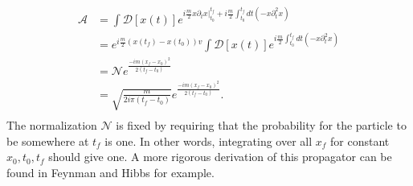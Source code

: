 \begin{equation}
\begin{split}
\mathcal{A} &= \int \mathcal{D}[x(t)] e^{i\frac{m}{2}x\partial_t x|^{t_f}_{t_0} + i\frac{m}{2}\int_{t_0}^{t_f} dt (-x \partial^2_t x)} \\ 
            &= e^{i\frac{m}{2}(x(t_f) - x(t_0))v}\int \mathcal{D}[x(t)] e^{i\frac{m}{2}\int_{t_0}^{t_f} dt (-x \partial^2_t x)} \\
            &= \mathcal{N}e^{\frac{-im(x_f - x_0)^2}{2(t_f - t_0)}} \\
            &= \sqrt{\frac{m}{2i\pi(t_f-t_0)}}e^{\frac{-im(x_f - x_0)^2}{2(t_f - t_0)}}. \\
\end{split}
\end{equation}
The normalization $\mathcal{N}$ is fixed by requiring that the probability for the particle to be somewhere at $t_f$ is one. In other words, integrating over all $x_f$ for constant $x_0, t_0, t_f$ should give one. A more rigorous derivation of this propagator can be found in {\color{red} Feynman and Hibbs} for example.

